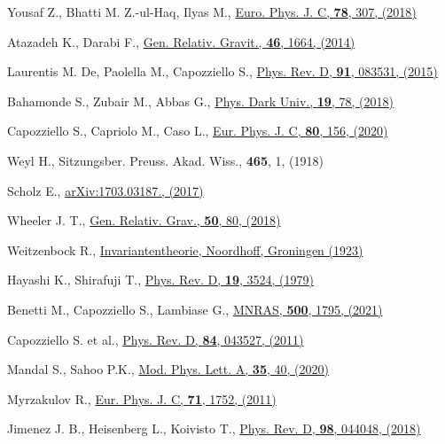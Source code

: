 \begin{thebibliography}{99}
 Yousaf Z., Bhatti M. Z.-ul-Haq, Ilyas M., \href{https://doi.org/10.1140/epjc/s10052-018-5797-x}{Euro. Phys. J. C, \textbf{78}, 307, (2018)}

 Atazadeh K., Darabi F., \href{https://doi.org/10.1007/s10714-014-1664-8}{Gen. Relativ. Gravit., \textbf{46}, 1664, (2014)}

 Laurentis M. De, Paolella M., Capozziello S., \href{https://doi.org/10.1103/PhysRevD.91.083531}{Phys. Rev. D, \textbf{91}, 083531, (2015)}

 Bahamonde S., Zubair M., Abbas G., \href{https://doi.org/10.1016/j.dark.2017.12.005}{Phys. Dark Univ., \textbf{19}, 78, (2018)}

 Capozziello S., Capriolo M., Caso L., \href{https://doi.org/10.1140/epjc/s10052-020-7737-9}{Eur. Phys. J. C, \textbf{80}, 156, (2020)}

 Weyl H., Sitzungsber. Preuss. Akad. Wiss., \textbf{465}, 1, (1918)

 Scholz E., \href{https://arxiv.org/abs/1703.03187}{arXiv:1703.03187., (2017)}

 Wheeler J. T., \href{https://doi.org/10.1007/s10714-018-2401-5}{Gen. Relativ. Grav., \textbf{50}, 80, (2018)}

 Weitzenbock R., \href{http://name.umdl.umich.edu/ABV0733.0001.001}{Invariantentheorie, Noordhoff, Groningen (1923)}

 Hayashi K., Shirafuji T., \href{https://doi.org/10.1103/PhysRevD.19.3524}{Phys. Rev. D, \textbf{19}, 3524, (1979)}

 Benetti M., Capozziello S., Lambiase G., \href{https://doi.org/10.1093/mnras/staa3368}{MNRAS, \textbf{500}, 1795, (2021)}

 Capozziello S. et al., \href{https://doi.org/10.1103/PhysRevD.84.043527}{Phys. Rev. D, \textbf{84}, 043527, (2011)}

 Mandal S., Sahoo P.K., \href{https://doi.org/10.1142/S0217732320503289}{Mod. Phys. Lett. A, \textbf{35}, 40, (2020)}

 Myrzakulov R., \href{https://doi.org/10.1140/epjc/s10052-011-1752-9}{Eur. Phys. J. C, \textbf{71}, 1752, (2011)}

 Jimenez J. B., Heisenberg L., Koivisto T., \href{https://doi.org/10.1103/PhysRevD.98.044048}{Phys. Rev. D, \textbf{98}, 044048, (2018)} 


\end{thebibliography}
